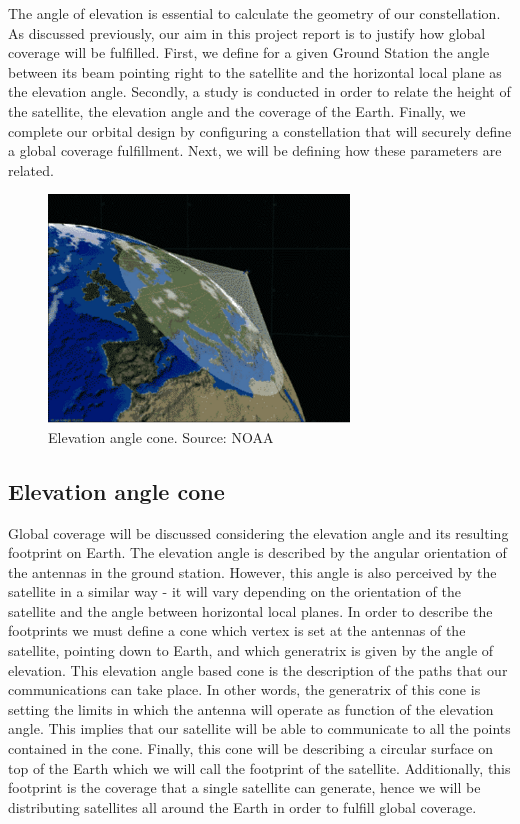 The angle of elevation is essential to calculate the geometry of our constellation. As discussed previously, our aim in this project report is to justify how global coverage will be fulfilled. First, we define for a given Ground Station the angle between its beam pointing right to the satellite and the horizontal local plane as the elevation angle. Secondly, a study is conducted in order to relate the height of the satellite, the elevation angle and the coverage of the Earth. Finally, we complete our orbital design by configuring a constellation that will securely define a global coverage fulfillment. Next, we will be defining how these parameters are related. 

\begin{figure}[H]
\includegraphics[width=8cm]{noaa}
\centering
\caption[Elevation angle cone]{Elevation angle cone. Source: NOAA}
\end{figure}

\subsection{Elevation angle cone}
Global coverage will be discussed considering the elevation angle and its resulting footprint on Earth. The elevation angle is described by the angular orientation of the antennas in the ground station. However, this angle is also perceived by the satellite in a similar way - it will vary depending on the orientation of the satellite and the angle between horizontal local planes. In order to describe the footprints we must define a cone which vertex is set at the antennas of the satellite, pointing down to Earth, and which generatrix is given by the angle of elevation. This elevation angle based cone is the description of the paths that our communications can take place. In other words, the generatrix of this cone is setting the limits in which the antenna will operate as function of the elevation angle. This implies that our satellite will be able to communicate to all the points contained in the cone. Finally, this cone will be describing a circular surface on top of the Earth which we will call the footprint of the satellite. Additionally, this footprint is the coverage that a single satellite can generate, hence we will be distributing satellites all around the Earth in order to fulfill global coverage. 

